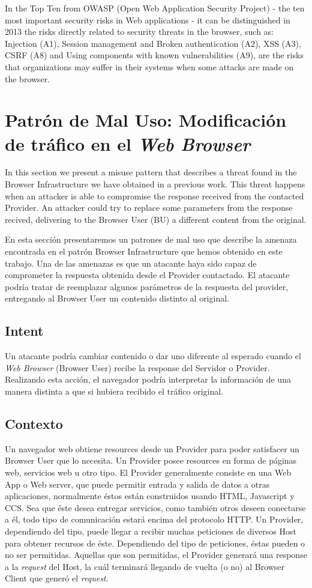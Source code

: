 \documentclass{sig-alternate-05-2015}
\begin{document}
In the Top Ten from OWASP \cite{owaspTopTen} (Open Web Application Security Project) - the ten most important security risks in Web applications - it can be distinguished in 2013 the risks directly related to security threats in the browser, such as: Injection (A1), Session management and Broken authentication (A2), XSS (A3), CSRF (A8) and Using components with known vulnerabilities (A9), are the risks that organizations may suffer in their systems when some attacks are made on the browser.


\section{Patrón de Mal Uso: Modificación de tráfico en el \textit{Web Browser}}
In this section we present a misuse pattern that describes a threat found in the Browser Infrastructure we have obtained in a previous work. This threat happens when an attacker is able to compromise the response received from the contacted Provider. An attacker could try to replace some parameters from the response recived, delivering to the Browser User (BU) a different content from the original.

En esta sección presentaremos un patrones de mal uso que describe la amenaza encontrada en el patrón Browser Infrastructure que hemos obtenido en este trabajo.
Una de las amenazas es que un atacante haya sido capaz de comprometer la respuesta obtenida desde el Provider contactado. El atacante podría tratar de reemplazar algunos parámetros de la respuesta del provider, entregando al Browser User un contenido distinto al original.

\subsection{Intent}
Un atacante podría cambiar contenido o dar uno diferente al esperado cuando el \textit{Web Browser} (Browser User) recibe la response del Servidor o Provider. Realizando esta acción, el navegador podría interpretar la información de una manera distinta a que si hubiera recibido el tráfico original.

\subsection{Contexto}
Un navegador web obtiene resources desde un Provider para poder satisfacer un Browser User que lo necesita. Un Provider posee resources en forma de páginas web, servicios web u otro tipo. El Provider generalmente consiste en una Web App o Web server, que puede permitir entrada y salida de datos a otras aplicaciones, normalmente éstos están construidos usando HTML, Javascript y CCS. Sea que éste desea entregar servicios, como también otros deseen conectarse a él, todo tipo de comunicación estará encima del protocolo HTTP. Un Provider, dependiendo del tipo, puede llegar a recibir muchas peticiones de diversos Host para obtener recursos de éste. Dependiendo del tipo de peticiones, éstas pueden o no ser permitidas. Aquellas que son permitidas, el Provider generará una response a la \textit{request} del Host, la cuál terminará llegando de vuelta (o no) al Browser Client que generó el \textit{request}.
\end{document}
